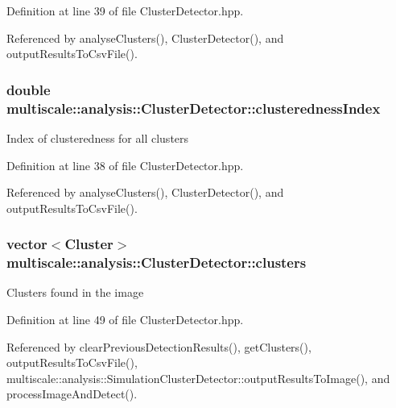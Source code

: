 Definition at line 39 of file Cluster\-Detector.\-hpp.



Referenced by analyse\-Clusters(), Cluster\-Detector(), and output\-Results\-To\-Csv\-File().

\hypertarget{classmultiscale_1_1analysis_1_1ClusterDetector_a5e2bf77041bd0d5047dd16c4632c16b7}{
\subsubsection[{clusteredness\-Index}]{\setlength{\rightskip}{0pt plus 5cm}double multiscale\-::analysis\-::\-Cluster\-Detector\-::clusteredness\-Index\hspace{0.3cm}{\ttfamily [protected]}}}\label{classmultiscale_1_1analysis_1_1ClusterDetector_a5e2bf77041bd0d5047dd16c4632c16b7}
Index of clusteredness for all clusters 

Definition at line 38 of file Cluster\-Detector.\-hpp.



Referenced by analyse\-Clusters(), Cluster\-Detector(), and output\-Results\-To\-Csv\-File().

\hypertarget{classmultiscale_1_1analysis_1_1ClusterDetector_aa81a8649bc743389c2fc1919d47eb5b3}{
\subsubsection[{clusters}]{\setlength{\rightskip}{0pt plus 5cm}vector$<${\bf Cluster}$>$ multiscale\-::analysis\-::\-Cluster\-Detector\-::clusters\hspace{0.3cm}{\ttfamily [protected]}}}\label{classmultiscale_1_1analysis_1_1ClusterDetector_aa81a8649bc743389c2fc1919d47eb5b3}
Clusters found in the image 

Definition at line 49 of file Cluster\-Detector.\-hpp.



Referenced by clear\-Previous\-Detection\-Results(), get\-Clusters(), output\-Results\-To\-Csv\-File(), multiscale\-::analysis\-::\-Simulation\-Cluster\-Detector\-::output\-Results\-To\-Image(), and process\-Image\-And\-Detect().

